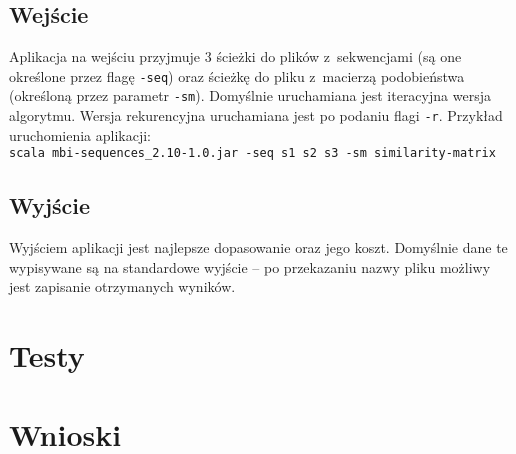 \documentclass[12pt, a4paper]{article}
\begin{document}
	\subsection{Wejście}
	Aplikacja na wejściu przyjmuje 3 ścieżki do plików z~sekwencjami (są one określone przez flagę \texttt{-seq}) oraz ścieżkę do pliku z~macierzą podobieństwa (określoną przez parametr \texttt{-sm}). Domyślnie uruchamiana jest iteracyjna wersja algorytmu. Wersja rekurencyjna uruchamiana jest po podaniu flagi \texttt{-r}.
	Przykład uruchomienia aplikacji: \\
	\texttt{scala mbi-sequences\_2.10-1.0.jar -seq s1 s2 s3 -sm similarity-matrix}
	\subsection{Wyjście}
	Wyjściem aplikacji jest najlepsze dopasowanie oraz jego koszt. Domyślnie dane te wypisywane są na standardowe wyjście -- po przekazaniu nazwy pliku możliwy jest zapisanie otrzymanych wyników.
	
\section{Testy}

\section{Wnioski}

\nocite{*}


\end{document}
